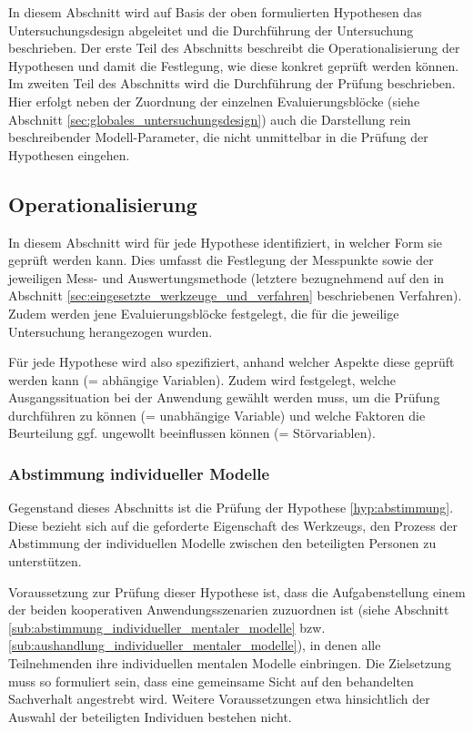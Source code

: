 In diesem Abschnitt wird auf Basis der oben formulierten Hypothesen das Untersuchungsdesign abgeleitet und die Durchführung der Untersuchung beschrieben. Der erste Teil des Abschnitts beschreibt die Operationalisierung der Hypothesen und damit die Festlegung, wie diese konkret geprüft werden können. Im zweiten Teil des Abschnitts wird die Durchführung der Prüfung beschrieben. Hier erfolgt neben der Zuordnung der einzelnen Evaluierungsblöcke (siehe Abschnitt \ref{sec:globales_untersuchungsdesign}) auch die Darstellung rein beschreibender Modell-Parameter, die nicht unmittelbar in die Prüfung der Hypothesen eingehen. 

\subsection{Operationalisierung} %
\label{sub:a_operationalisierung}

In diesem Abschnitt wird für jede Hypothese identifiziert, in welcher Form sie geprüft werden kann. Dies umfasst die Festlegung der Messpunkte sowie der jeweiligen Mess- und Auswertungsmethode (letztere bezugnehmend auf den in Abschnitt \ref{sec:eingesetzte_werkzeuge_und_verfahren} beschriebenen Verfahren). Zudem werden jene Evaluierungsblöcke festgelegt, die für die jeweilige Untersuchung herangezogen wurden.

Für jede Hypothese wird also spezifiziert, anhand welcher Aspekte diese geprüft werden kann (= abhängige Variablen). Zudem wird festgelegt, welche Ausgangssituation bei der Anwendung gewählt werden muss, um die Prüfung durchführen zu können (= unabhängige Variable) und welche Faktoren die Beurteilung ggf. ungewollt beeinflussen können (= Störvariablen).

\subsubsection{Abstimmung individueller Modelle} %
\label{ssub:abstimmung_individueller_modelle}

Gegenstand dieses Abschnitts ist die Prüfung der Hypothese \ref{hyp:abstimmung}. Diese bezieht sich auf die geforderte Eigenschaft des Werkzeugs, den Prozess der Abstimmung der individuellen Modelle zwischen den beteiligten Personen zu unterstützen.

Voraussetzung zur Prüfung dieser Hypothese ist, dass die Aufgabenstellung einem der beiden kooperativen Anwendungsszenarien zuzuordnen ist (siehe Abschnitt \ref{sub:abstimmung_individueller_mentaler_modelle} bzw. \ref{sub:aushandlung_individueller_mentaler_modelle}), in denen alle Teilnehmenden ihre individuellen mentalen Modelle einbringen. Die Zielsetzung muss so formuliert sein, dass eine gemeinsame Sicht auf den behandelten Sachverhalt angestrebt wird. Weitere Voraussetzungen etwa hinsichtlich der Auswahl der beteiligten Individuen bestehen nicht.

